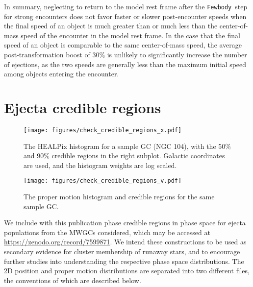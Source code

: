 \documentclass[twocolumn,linenumbers]{aastex631}
\newcommand{\fewbody}{\texttt{Fewbody}}
\begin{document}
In summary, neglecting to return to the model rest frame after the \fewbody\ step for strong encounters does not favor faster or slower post-encounter speeds when the final speed of an object is much greater than or much less than the center-of-mass speed of the encounter in the model rest frame.
In the case that the final speed of an object is comparable to the same center-of-mass speed, the average post-transformation boost of 30\% is unlikely to significantly increase the number of ejections, as the two speeds are generally less than the maximum initial speed among objects entering the encounter.

\section{Ejecta credible regions} \label{app:credreg}

\begin{figure}
    \centering
    \texttt{[image: figures/check\_credible\_regions\_x.pdf]}
    \caption{
        The HEALPix histogram for a sample GC (NGC 104), with the 50\% and 90\% credible regions in the right subplot.
        Galactic coordinates are used, and the histogram weights are log scaled.
    }
    \label{fig:check_credible_regions_x}
\end{figure}

\begin{figure}
    \centering
    \texttt{[image: figures/check\_credible\_regions\_v.pdf]}
    \caption{
        The proper motion histogram and credible regions for the same sample GC.
    }
    \label{fig:check_credible_regions_v}
\end{figure}

We include with this publication phase credible regions in phase space for ejecta populations from the MWGCs considered, which may be accessed at \url{https://zenodo.org/record/7599871}.
We intend these constructions to be used as secondary evidence for cluster membership of runaway stars, and to encourage further studies into understanding the respective phase space distributions.
The 2D position and proper motion distributions are separated into two different files, the conventions of which are described below.
\end{document}
